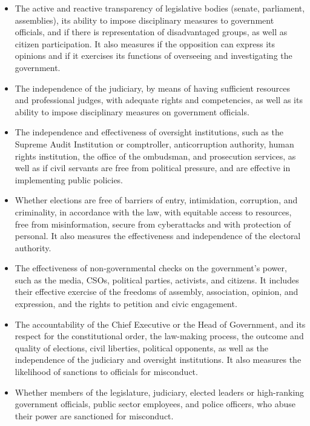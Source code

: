 \documentclass[
]{agujournal2019}
\providecommand{\tightlist}{%
  \setlength{\itemsep}{0pt}\setlength{\parskip}{0pt}}\usepackage{longtable,booktabs,array}
\begin{document}
\begin{itemize}
\tightlist
\item
  The active and reactive transparency of legislative bodies (senate,
  parliament, assemblies), its ability to impose disciplinary measures
  to government officials, and if there is representation of
  disadvantaged groups, as well as citizen participation. It also
  measures if the opposition can express its opinions and if it
  exercises its functions of overseeing and investigating the
  government.
\item
  The independence of the judiciary, by means of having sufficient
  resources and professional judges, with adequate rights and
  competencies, as well as its ability to impose disciplinary measures
  on government officials.
\item
  The independence and effectiveness of oversight institutions, such as
  the Supreme Audit Institution or comptroller, anticorruption
  authority, human rights institution, the office of the ombudsman, and
  prosecution services, as well as if civil servants are free from
  political pressure, and are effective in implementing public policies.
\item
  Whether elections are free of barriers of entry, intimidation,
  corruption, and criminality, in accordance with the law, with
  equitable access to resources, free from misinformation, secure from
  cyberattacks and with protection of personal. It also measures the
  effectiveness and independence of the electoral authority.
\item
  The effectiveness of non-governmental checks on the government's
  power, such as the media, CSOs, political parties, activists, and
  citizens. It includes their effective exercise of the freedoms of
  assembly, association, opinion, and expression, and the rights to
  petition and civic engagement.
\item
  The accountability of the Chief Executive or the Head of Government,
  and its respect for the constitutional order, the law-making process,
  the outcome and quality of elections, civil liberties, political
  opponents, as well as the independence of the judiciary and oversight
  institutions. It also measures the likelihood of sanctions to
  officials for misconduct.
\item
  Whether members of the legislature, judiciary, elected leaders or
  high-ranking government officials, public sector employees, and police
  officers, who abuse their power are sanctioned for misconduct.
\end{itemize}
\end{document}
